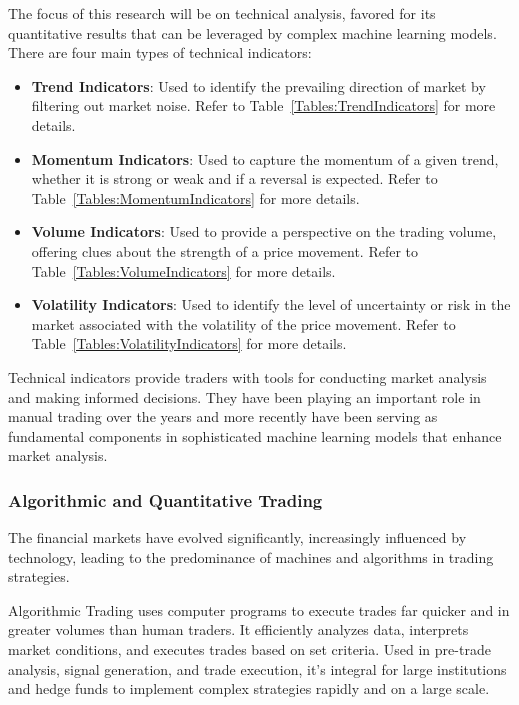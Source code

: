 The focus of this research will be on technical analysis, favored for its quantitative results that can be leveraged by complex machine learning models. There are four main types of technical indicators:

\begin{itemize}
\item \textbf{Trend Indicators}: Used to identify the prevailing direction of market by filtering out market noise. Refer to Table~\ref{Tables:TrendIndicators} for more details.
\item \textbf{Momentum Indicators}: Used to capture the momentum of a given trend, whether it is strong or weak and if a reversal is expected. Refer to Table~\ref{Tables:MomentumIndicators} for more details.
\item \textbf{Volume Indicators}: Used to provide a perspective on the trading volume, offering clues about the strength of a price movement. Refer to Table~\ref{Tables:VolumeIndicators} for more details.
\item \textbf{Volatility Indicators}: Used to identify the level of uncertainty or risk in the market associated with the volatility of the price movement. Refer to Table~\ref{Tables:VolatilityIndicators} for more details.
\end{itemize}






Technical indicators provide traders with tools for conducting market analysis and making informed decisions. They have been playing an important role in manual trading over the years and more recently have been serving as fundamental components in sophisticated machine learning models that enhance market analysis.

\subsubsection{Algorithmic and Quantitative Trading}
The financial markets have evolved significantly, increasingly influenced by technology, leading to the predominance of machines and algorithms in trading strategies. 

Algorithmic Trading uses computer programs to execute trades far quicker and in greater volumes than human traders. It efficiently analyzes data, interprets market conditions, and executes trades based on set criteria. Used in pre-trade analysis, signal generation, and trade execution, it's integral for large institutions and hedge funds to implement complex strategies rapidly and on a large scale.

